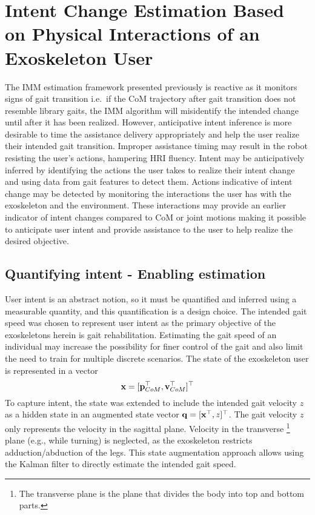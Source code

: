 \chapter{Intent Change Estimation Based on Physical Interactions of an	Exoskeleton User}\label{chapter:BKF}
The IMM estimation framework presented previously is reactive as it monitors signs of gait transition i.e.~if the CoM trajectory after gait transition does not resemble library gaits, the IMM algorithm will misidentify the intended change until after it has been realized. However, anticipative intent inference is more desirable to time the assistance delivery appropriately and help the user realize their intended gait transition. Improper assistance timing may result in the robot resisting the user's actions, hampering HRI fluency. Intent may be anticipatively inferred by identifying the actions the user takes to realize their intent change and using data from gait features to detect them. Actions indicative of intent change may be detected by monitoring the interactions the user has with the exoskeleton and the environment. These interactions may provide an earlier indicator of intent changes compared to CoM or joint motions making it possible to anticipate user intent and provide assistance to the user to help realize the desired objective. 

\section{Quantifying intent - Enabling estimation}
User intent is an abstract notion, so it must be quantified and inferred using a measurable quantity, and this quantification is a design choice. The intended gait speed was chosen to represent user intent as the primary objective of the exoskeletons herein is gait rehabilitation. Estimating the gait speed of an individual may increase the possibility for finer control of the gait and also limit the need to train for multiple discrete scenarios. The state of the exoskeleton user is represented in a vector \[\mathbf{x} = [\mathbf{p}_{CoM}^{\top} ,\mathbf{v}_{CoM}^{\top}]^{\top} \] 
To capture intent, the state was extended to include the intended gait velocity $ z $ as a hidden state in an augmented state vector $ \mathbf{q} = [\mathbf{x}^{\top} ,z]^{\top} $. The gait velocity $ z $ only represents the velocity in the sagittal plane. Velocity in the transverse \footnote{The transverse plane is the plane that divides the body into top and bottom parts. } plane (e.g., while turning) is neglected, as the exoskeleton restricts adduction/abduction of the legs. This state augmentation approach allows using the Kalman filter to directly estimate the intended gait speed. 

